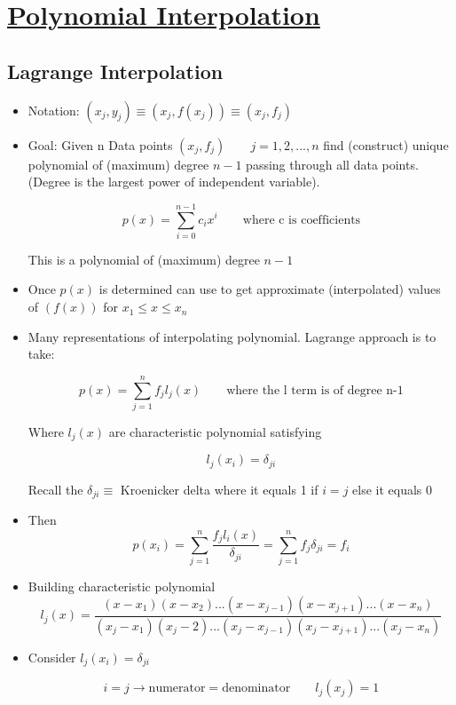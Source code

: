\def \secname {Polynomial Interpolation}

\section[\secname]{\hyperlink{toc}{\secname}}

\subsection{Lagrange Interpolation}

\begin{itemize}
    \item Notation: $(x_j, y_j) \equiv (x_j, f(x_j)) \equiv (x_j, f_j)$
    \item Goal: Given n Data points $(x_j, f_j) \qquad j=1,2,...,n$ find (construct) unique polynomial of (maximum) degree $n-1$ passing through all data points. (Degree is the largest power of independent variable).

    \[p(x) = \sum_{i=0}^{n-1} c_i x^i \qquad \text{where c is coefficients}\]

    This is a polynomial of (maximum) degree $n-1$
    \item Once $p(x)$ is determined can use to get approximate (interpolated) values of $(f(x))$ for $x_1 \le x \le x_n$

    \item Many representations of interpolating polynomial. Lagrange approach is to take:

    \[p(x) = \sum_{j=1}^{n} f_j l_j(x) \qquad \text{where the l term is of degree n-1}\]

    Where $l_j(x)$ are characteristic polynomial satisfying

    \[l_j(x_i) = \delta_{ji}\]

    Recall the $\delta_{ji} \equiv $ Kroenicker delta where it equals 1 if $i=j$ else it equals 0

    \item Then
 \[p(x_i) = \sum_{j=1}^{n} \frac{f_jl_i(x)}{\delta_{ji}} = \sum_{j=1}^n f_j \delta_{ji} = f_i\]

    \item Building characteristic polynomial
    \[ l_j(x) = \frac{(x-x_1)(x-x_2)...(x-x_{j-1})(x-x_{j+1})...(x-x_n)}{(x_j-x_1)(x_j-2)...(x_j-x_{j-1})(x_j-x_{j+1})...(x_j-x_n)}\] 
    \item Consider $l_j(x_i)=\delta_{ji}$

    \[i=j \rightarrow \text{numerator}=\text{denominator} \qquad l_j(x_j) = 1\]


\end{itemize}

